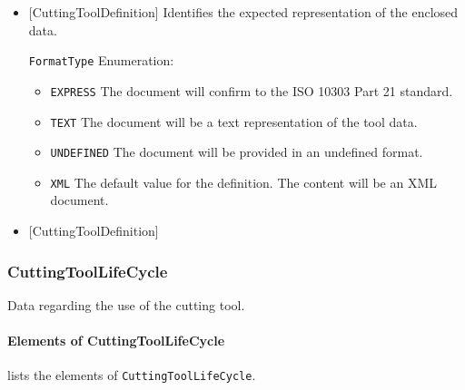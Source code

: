 \begin{itemize}

\item {}[CuttingToolDefinition] \newline Identifies the expected representation of the enclosed data.

\texttt{FormatType} Enumeration:

\begin{itemize}
\item \texttt{EXPRESS} \newline The document will confirm to the ISO 10303 Part 21 standard.
 
\item \texttt{TEXT} \newline The document will be a text representation of the tool data.
 
\item \texttt{UNDEFINED} \newline The document will be provided in an undefined format. 
\item \texttt{XML} \newline The default value for the definition. The content will be an XML document. 
\end{itemize}


\item {}[CuttingToolDefinition] \newline 
\end{itemize}

\subsubsection{CuttingToolLifeCycle}
\label{sec:CuttingToolLifeCycle}



Data regarding the use of the cutting tool.


\paragraph{Elements of CuttingToolLifeCycle}\mbox{}
\label{sec:Elements of CuttingToolLifeCycle}

 lists the elements of \texttt{CuttingToolLifeCycle}.

